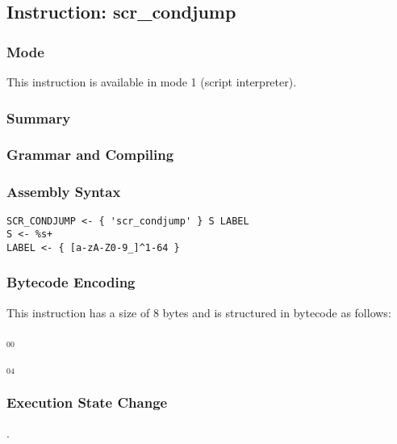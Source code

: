 \subsection{Instruction: scr\_condjump}

\subsubsection{Mode}
This instruction is available in mode 1 (script interpreter).
\subsubsection{Summary}


\subsubsection{Grammar and Compiling}


\subsubsection{Assembly Syntax}

\begin{myquote}
\begin{verbatim}
SCR_CONDJUMP <- { 'scr_condjump' } S LABEL
S <- %s+
LABEL <- { [a-zA-Z0-9_]^1-64 }
\end{verbatim}
\end{myquote}

\subsubsection{Bytecode Encoding}

This instruction has a size of 8 bytes and is structured in bytecode as follows:

$_{00}$\ 



$_{04}$\ 


\subsubsection{Execution State Change}

.



